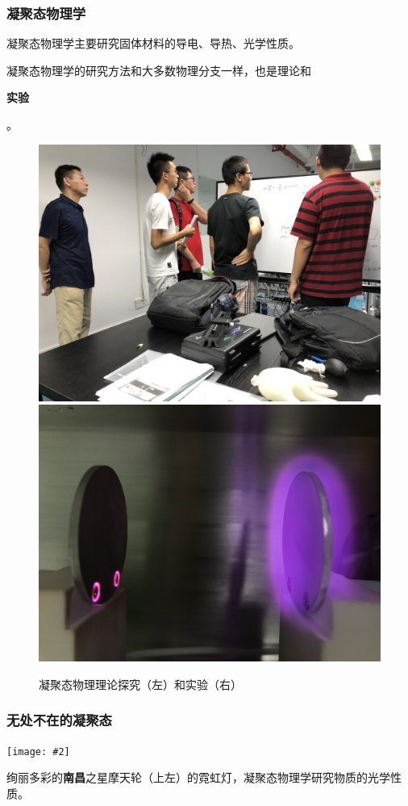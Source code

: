 \documentclass[CJK]{beamer}
\newcommand{\cpic}[2]{
\begin{center}
\texttt{[image: \#2]}
\end{center}
}
\begin{document}
\begin{frame}
\frametitle{\bch 凝聚态物理学 \ech}
\bch
凝聚态物理学主要研究固体材料的导电、导热、光学性质。
\par
凝聚态物理学的研究方法和大多数物理分支一样，也是理论和\begin{LARGE} {\bf 实验 } \end{LARGE}。
\begin{figure}[h!]
\includegraphics[scale=0.028]{theory}
\includegraphics[scale=0.028]{expe}
\caption{凝聚态物理理论探究（左）和实验（右）}
\end{figure}
\ech
\end{frame}

\begin{frame}
\frametitle{\bch 无处不在的凝聚态 \ech}
\bch
\cpic{0.035}{nanchang}
绚丽多彩的{\bf 南昌}之星摩天轮（上左）的霓虹灯，凝聚态物理学研究物质的光学性质。
\ech
\end{frame}
\end{document}
